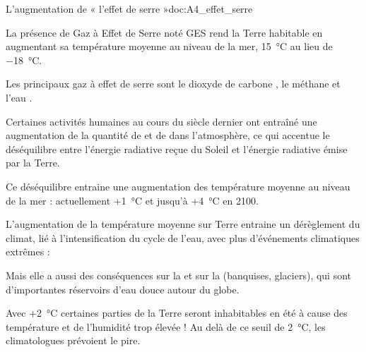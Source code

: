 \begin{doc}{L'augmentation de « l'effet de serre »}{doc:A4_effet_serre}
  
  La présence de Gaz à Effet de Serre noté GES rend la Terre habitable en augmentant sa température moyenne au niveau de la mer, \qty{15}{\degreeCelsius} au lieu de \qty{-18}{\degreeCelsius}.

  \begin{importants}  
    Les principaux gaz à effet de serre sont le dioxyde de carbone \dioxydeDeCarbone,
    le méthane \methane et l'eau \eau.
  \end{importants}

  Certaines activités humaines au cours du siècle dernier ont entraîné une augmentation de la quantité de \dioxydeDeCarbone et de \methane dans l'atmosphère, ce qui accentue le déséquilibre entre l'énergie radiative reçue du Soleil et l'énergie radiative émise par la Terre.

  Ce déséquilibre entraine une augmentation des température moyenne au niveau de la mer : actuellement +\qty{1}{\degreeCelsius} et jusqu'à +\qty{4}{\degreeCelsius} en 2100.

  \begin{importants}
    L'augmentation de la température moyenne sur Terre entraine un dérèglement du climat, lié à l'intensification du cycle de l'eau, avec plus d'événements climatiques extrêmes : 
  \end{importants}
  \begin{importants}
    Mais elle a aussi des conséquences sur la  et sur la  (banquises, glaciers), qui sont d'importantes réservoirs d'eau douce autour du globe.
  \end{importants}

  Avec +\qty{2}{\degreeCelsius} certaines parties de la Terre seront inhabitables en été à cause des température et de l'humidité trop élevée ! 
  Au delà de ce seuil de \qty{2}{\degreeCelsius}, les climatologues prévoient le pire.
\end{doc}


